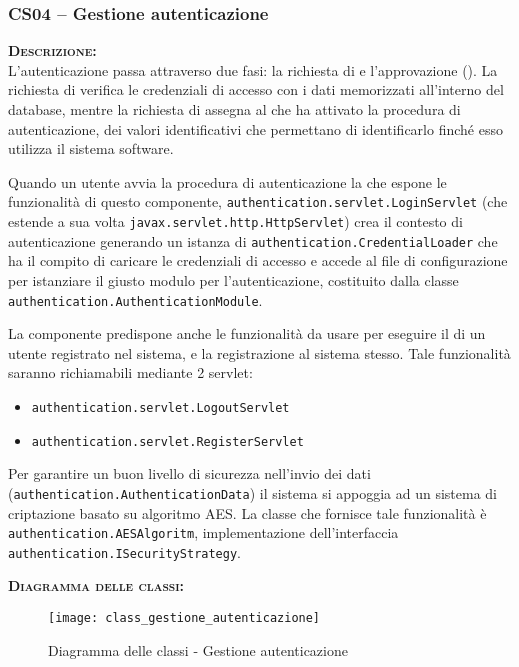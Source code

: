 \subsubsection{CS04 -- Gestione autenticazione}\label{sec:cs04}
\begin{description}
  \item{\scshape\bfseries Descrizione:}\\
L'autenticazione passa attraverso due fasi: la richiesta di  e l'approvazione (). La richiesta di  verifica le credenziali di accesso con i dati memorizzati all'interno del database, mentre la richiesta di  assegna al  che ha attivato la procedura di autenticazione, dei valori identificativi che permettano di identificarlo finché esso utilizza il sistema software.

Quando un utente avvia la procedura di autenticazione la  che espone le funzionalità di questo componente, \texttt{authentication.servlet.LoginServlet} (che estende a sua volta \texttt{javax.servlet.http.HttpServlet}) crea il contesto di autenticazione generando un istanza di \texttt{authentication.CredentialLoader} che ha il compito di caricare le credenziali di accesso e accede al file di configurazione per istanziare il giusto modulo per l'autenticazione, costituito dalla classe \texttt{authentication.AuthenticationModule}.

La componente predispone anche le funzionalità da usare per eseguire il  di un utente registrato nel sistema, e la registrazione al sistema stesso. Tale funzionalità saranno richiamabili mediante 2 servlet:
\begin{itemize}
	\item \texttt{authentication.servlet.LogoutServlet}
	\item \texttt{authentication.servlet.RegisterServlet}
\end{itemize}

Per garantire un buon livello di sicurezza nell'invio dei dati (\texttt{authentication.AuthenticationData}) il sistema si appoggia ad un sistema di criptazione basato su algoritmo AES. La classe che fornisce tale funzionalità è \texttt{authentication.AESAlgoritm}, implementazione dell'interfaccia \texttt{authentication.ISecurityStrategy}.
  
  \item{\scshape\bfseries Diagramma delle classi:}
\begin{figure}[H]
  \centering
 \texttt{[image: class\_gestione\_autenticazione]}
  \caption{Diagramma delle classi - Gestione autenticazione}\label{fig:gestioneautenticazione}
\end{figure}	
  

\end{description}
